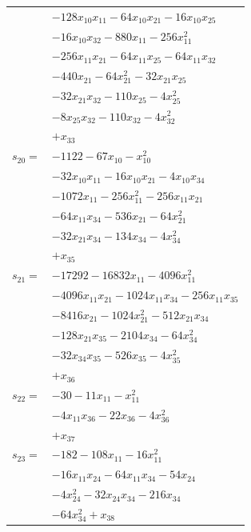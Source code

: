 \begin{longtable}{@{}r@{\;}l@{}}
 & \(\displaystyle -128x_{10}x_{11} -64x_{10}x_{21} -16x_{10}x_{25}\) \\
 & \(\displaystyle -16x_{10}x_{32} -880x_{11} -256x_{11}^{2}\) \\
 & \(\displaystyle -256x_{11}x_{21} -64x_{11}x_{25} -64x_{11}x_{32}\) \\
 & \(\displaystyle -440x_{21} -64x_{21}^{2} -32x_{21}x_{25}\) \\
 & \(\displaystyle -32x_{21}x_{32} -110x_{25} -4x_{25}^{2}\) \\
 & \(\displaystyle -8x_{25}x_{32} -110x_{32} -4x_{32}^{2}\) \\
 & \(\displaystyle +x_{33}\) \\[3pt]
\(s_{20}=\) & \(\displaystyle -1122 -67x_{10} -x_{10}^{2}\) \\
 & \(\displaystyle -32x_{10}x_{11} -16x_{10}x_{21} -4x_{10}x_{34}\) \\
 & \(\displaystyle -1072x_{11} -256x_{11}^{2} -256x_{11}x_{21}\) \\
 & \(\displaystyle -64x_{11}x_{34} -536x_{21} -64x_{21}^{2}\) \\
 & \(\displaystyle -32x_{21}x_{34} -134x_{34} -4x_{34}^{2}\) \\
 & \(\displaystyle +x_{35}\) \\[3pt]
\(s_{21}=\) & \(\displaystyle -17292 -16832x_{11} -4096x_{11}^{2}\) \\
 & \(\displaystyle -4096x_{11}x_{21} -1024x_{11}x_{34} -256x_{11}x_{35}\) \\
 & \(\displaystyle -8416x_{21} -1024x_{21}^{2} -512x_{21}x_{34}\) \\
 & \(\displaystyle -128x_{21}x_{35} -2104x_{34} -64x_{34}^{2}\) \\
 & \(\displaystyle -32x_{34}x_{35} -526x_{35} -4x_{35}^{2}\) \\
 & \(\displaystyle +x_{36}\) \\[3pt]
\(s_{22}=\) & \(\displaystyle -30 -11x_{11} -x_{11}^{2}\) \\
 & \(\displaystyle -4x_{11}x_{36} -22x_{36} -4x_{36}^{2}\) \\
 & \(\displaystyle +x_{37}\) \\[3pt]
\(s_{23}=\) & \(\displaystyle -182 -108x_{11} -16x_{11}^{2}\) \\
 & \(\displaystyle -16x_{11}x_{24} -64x_{11}x_{34} -54x_{24}\) \\
 & \(\displaystyle -4x_{24}^{2} -32x_{24}x_{34} -216x_{34}\) \\
 & \(\displaystyle -64x_{34}^{2} +x_{38}\) \\[3pt]

\end{longtable}
